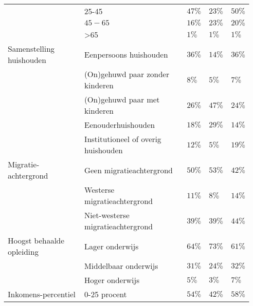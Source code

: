 \documentclass[12pt, letterpaper]{article}
\begin{document}
\begin{appendices}
\begin{table}[H]
\begin{center}
{\begin{tabular}{|R{2.5cm}|R{3.5 cm}||C{2cm}|C{2cm}|C{2cm}|}
                \rule{0pt}{11pt}
                & 25-45 & $47\%$ & $23\%$ & $50\%$\\
                \rule{0pt}{11pt}
                & $45-65$ & $16\%$ & $23\%$ & $20\%$\\
                \rule{0pt}{11pt}
                & \textgreater{}65 & $1\%$ & $1\%$ & $1\%$\\
                \hline 
                \rule{0pt}{5pt}
                Samenstelling huishouden & Eenpersoons huishouden & $36\%$ & $14\%$ & $36\%$ \\ 
                \rule{0pt}{11pt}
                & (On)gehuwd paar zonder kinderen & $8\%$ & $5\%$ & $7\%$ \\
                \rule{0pt}{11pt}
                & (On)gehuwd paar met kinderen & $26\%$ & $47\%$ & $24\%$ \\
                \rule{0pt}{11pt}
                & Eenouderhuishouden & $18\%$ & $29\%$ & $14\%$\\
                \rule{0pt}{11pt}
                & Institutioneel of overig huishouden & $12\%$ & $5\%$ & $19\%$ \\
                \hline 
                \rule{0pt}{11pt}
                Migratie-achtergrond & Geen migratieachtergrond & $50\%$ & $53\%$ & $42\%$ \\   
                \rule{0pt}{11pt}
                & Westerse migratieachtergrond & $11\%$ & $8\%$ & $14\%$ \\
                \rule{0pt}{11pt}
                & Niet-westerse migratieachtergrond & $39\%$ & $39\%$ & $44\%$ \\
                \hline
                \rule{0pt}{5pt}
                Hoogst behaalde opleiding & Lager onderwijs & $64\%$ & $73\%$ & $61\%$ \\   
                \rule{0pt}{11pt}
                & Middelbaar onderwijs & $31\%$ & $24\%$ & $32\%$ \\
                \rule{0pt}{11pt}
                & Hoger onderwijs & $5\%$ & $3\%$ & $7\%$ \\
                \hline 
                \rule{0pt}{5pt}
                Inkomens-percentiel & 0-25 procent & $54\%$ & $42\%$ & $58\%$ \\

\end{tabular}}
\end{center}
\end{table}
\end{appendices}
\end{document}
